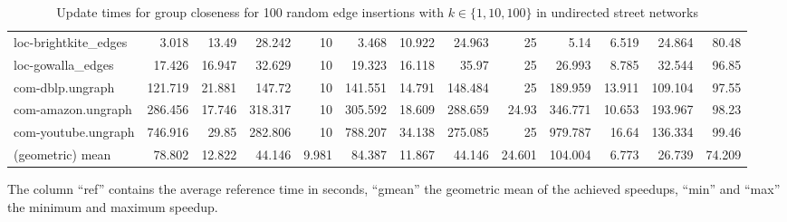 \begin{landscape}
\begin{table}[h!]
\begin{tabular}{l|rrrr|rrrr|rrrr}
 loc-brightkite\_edges &   3.018 &  13.49  &  28.242 &   10     &   3.468 &  10.922 &  24.963 &   25     &   5.14  &   6.519 &  24.864 &   80.48  \\
 loc-gowalla\_edges    &  17.426 &  16.947 &  32.629 &   10     &  19.323 &  16.118 &  35.97  &   25     &  26.993 &   8.785 &  32.544 &   96.85  \\
 com-dblp.ungraph     & 121.719 &  21.881 & 147.72  &   10     & 141.551 &  14.791 & 148.484 &   25     & 189.959 &  13.911 & 109.104 &   97.55  \\
 com-amazon.ungraph   & 286.456 &  17.746 & 318.317 &   10     & 305.592 &  18.609 & 288.659 &   24.93  & 346.771 &  10.653 & 193.967 &   98.23  \\
 com-youtube.ungraph  & 746.916 &  29.85  & 282.806 &   10     & 788.207 &  34.138 & 275.085 &   25     & 979.787 &  16.64  & 136.334 &   99.46  \\ \midrule \midrule
 (geometric) mean     &  78.802 &  12.822 &  44.146 &    9.981 &  84.387 &  11.867 &  44.146 &   24.601 & 104.004 &   6.773 &  26.739 &   74.209 \\
\bottomrule
\end{tabular}
\caption{Update times for group closeness for 100 random edge insertions with  $k \in \{1, 10, 100\}$ in undirected street networks}{The column ``ref'' contains the average reference time in seconds, ``gmean'' the geometric mean of the achieved speedups, ``min'' and ``max'' the minimum and maximum speedup.}
\label{tbl:groupClosenessResults}
\end{table}	
\end{landscape}


